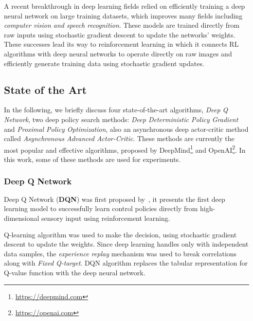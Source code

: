 A recent breakthrough in deep learning fields relied on efficiently training a deep neural network on large training datasets, which improves many fields including \textit{computer vision and speech recognition}. These models are trained directly from raw inputs using stochastic gradient descent to update the networks' weights. These successes lead its way to reinforcement learning in which it connects RL algorithms with deep neural networks to operate directly on raw images and efficiently generate training data using stochastic gradient updates.

\subsection{State of the Art}

In the following, we briefly discuss four state-of-the-art algorithms, \textit{Deep Q Network}, two deep policy search methods: \textit{Deep Deterministic Policy Gradient} and \textit{Proximal Policy Optimization}, also an asynchronous deep actor-critic method called \textit{Asynchronous Advanced Actor-Critic}.
These methods are currently the most popular and effective algorithms, proposed by DeepMind\footnote{\url{https://deepmind.com}} and OpenAI\footnote{\url{https://openai.com}}. In this work, some of these methods are used for experiments.

\subsubsection{Deep Q Network}
Deep Q Network (\textbf{DQN}) was first proposed by~\parencite{mnih2013playing}, it presents the first deep learning model to successfully learn control policies directly from high-dimensional sensory input using reinforcement learning.

Q-learning algorithm was used to make the decision, using stochastic gradient descent to update the weights. Since deep learning handles only with independent data samples, the \textit{experience replay} mechanism was used to break correlations along with \textit{Fixed Q-target}. DQN algorithm replaces the tabular representation for Q-value function with the deep neural network.

